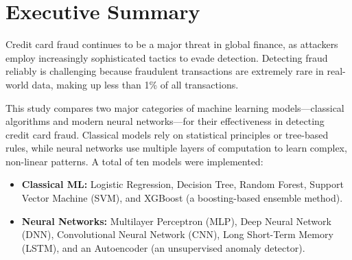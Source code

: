 \documentclass[journal]{IEEEtran}
\begin{document}
\begin{abstract}
This project compares classical machine learning algorithms with modern neural network architectures for credit card fraud detection. Using a highly imbalanced, anonymized dataset of 284,807 transactions (0.17\% fraud), I implemented five models from each paradigm and evaluated all ten on the same held-out test set of 85,443 transactions. Unlike many studies, this work preserves the original class imbalance (no oversampling or undersampling) and handles it with class weighting instead. It also includes an unsupervised autoencoder trained only on legitimate transactions, showing what is achievable when fraud labels are unavailable. Models were assessed with accuracy, precision, recall, F1-score, ROC AUC and precision--recall AUC. The classical ensembles performed best overall: XGBoost achieved the highest ROC AUC (0.9738) and Random Forest the highest F1-score (0.7516) and PR AUC (0.7975). The neural networks caught a similar share of fraud (recall 83.1\%--87.2\%) but with far more false alarms and lower ROC AUC (0.9323--0.9526), while training 20 to 160 times longer than XGBoost. The study concludes that, on structured tabular data of this kind, well-configured classical ensembles are the stronger and more practical choice.
\end{abstract}

\section{Executive Summary}
Credit card fraud continues to be a major threat in global finance, as attackers employ increasingly sophisticated tactics to evade detection. Detecting fraud reliably is challenging because fraudulent transactions are extremely rare in real-world data, making up less than 1\% of all transactions.

This study compares two major categories of machine learning models---classical algorithms and modern neural networks---for their effectiveness in detecting credit card fraud. Classical models rely on statistical principles or tree-based rules, while neural networks use multiple layers of computation to learn complex, non-linear patterns. A total of ten models were implemented:
\begin{itemize}
  \item \textbf{Classical ML:} Logistic Regression, Decision Tree, Random Forest, Support Vector Machine (SVM), and XGBoost (a boosting-based ensemble method).
  \item \textbf{Neural Networks:} Multilayer Perceptron (MLP), Deep Neural Network (DNN), Convolutional Neural Network (CNN), Long Short-Term Memory (LSTM), and an Autoencoder (an unsupervised anomaly detector).
\end{itemize}
\end{document}
